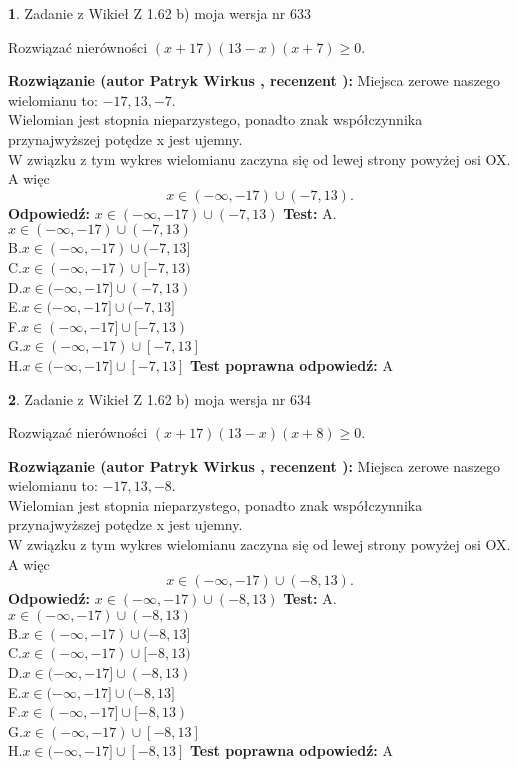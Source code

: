 \documentclass[12pt, a4paper]{article}
\theoremstyle{definition} %
\newtheorem{zad}{}
\newcommand{\zadStart}[1]{\begin{zad}#1\newline}
\newcommand{\zadStop}{\end{zad}}
\newcommand{\rozwStart}[2]{\noindent \textbf{Rozwiązanie (autor #1 , recenzent #2): }\newline}
\newcommand{\rozwStop}{\newline}
\newcommand{\odpStart}{\noindent \textbf{Odpowiedź:}\newline}
\newcommand{\odpStop}{\newline}
\newcommand{\testStart}{\noindent \textbf{Test:}\newline}
\newcommand{\testStop}{\newline}
\newcommand{\kluczStart}{\noindent \textbf{Test poprawna odpowiedź:}\newline}
\newcommand{\kluczStop}{\newline}
\begin{document}
\zadStart{Zadanie z Wikieł Z 1.62 b) moja wersja nr 633}

Rozwiązać nierówności $(x+17)(13-x)(x+7)\ge0$.
\zadStop
\rozwStart{Patryk Wirkus}{}
Miejsca zerowe naszego wielomianu to: $-17, 13, -7$.\\
Wielomian jest stopnia nieparzystego, ponadto znak współczynnika przy\linebreak najwyższej potędze x jest ujemny.\\ W związku z tym wykres wielomianu zaczyna się od lewej strony powyżej osi OX. A więc $$x \in (-\infty,-17) \cup (-7,13).$$
\rozwStop
\odpStart
$x \in (-\infty,-17) \cup (-7,13)$
\odpStop
\testStart
A.$x \in (-\infty,-17) \cup (-7,13)$\\
B.$x \in (-\infty,-17) \cup (-7,13]$\\
C.$x \in (-\infty,-17) \cup [-7,13)$\\
D.$x \in (-\infty,-17] \cup (-7,13)$\\
E.$x \in (-\infty,-17] \cup (-7,13]$\\
F.$x \in (-\infty,-17] \cup [-7,13)$\\
G.$x \in (-\infty,-17) \cup [-7,13]$\\
H.$x \in (-\infty,-17] \cup [-7,13]$
\testStop
\kluczStart
A
\kluczStop



\zadStart{Zadanie z Wikieł Z 1.62 b) moja wersja nr 634}

Rozwiązać nierówności $(x+17)(13-x)(x+8)\ge0$.
\zadStop
\rozwStart{Patryk Wirkus}{}
Miejsca zerowe naszego wielomianu to: $-17, 13, -8$.\\
Wielomian jest stopnia nieparzystego, ponadto znak współczynnika przy\linebreak najwyższej potędze x jest ujemny.\\ W związku z tym wykres wielomianu zaczyna się od lewej strony powyżej osi OX. A więc $$x \in (-\infty,-17) \cup (-8,13).$$
\rozwStop
\odpStart
$x \in (-\infty,-17) \cup (-8,13)$
\odpStop
\testStart
A.$x \in (-\infty,-17) \cup (-8,13)$\\
B.$x \in (-\infty,-17) \cup (-8,13]$\\
C.$x \in (-\infty,-17) \cup [-8,13)$\\
D.$x \in (-\infty,-17] \cup (-8,13)$\\
E.$x \in (-\infty,-17] \cup (-8,13]$\\
F.$x \in (-\infty,-17] \cup [-8,13)$\\
G.$x \in (-\infty,-17) \cup [-8,13]$\\
H.$x \in (-\infty,-17] \cup [-8,13]$
\testStop
\kluczStart
A
\kluczStop
\end{document}
